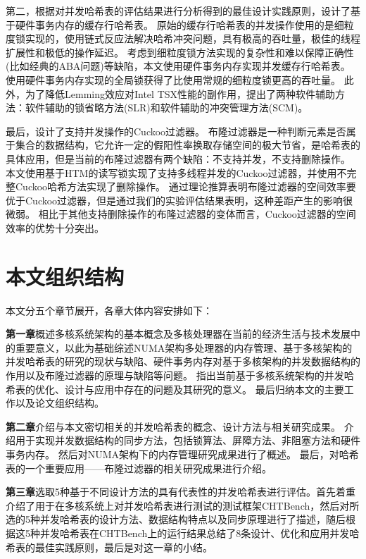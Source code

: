 第二，根据对并发哈希表的评估结果进行分析得到的最佳设计实践原则，设计了基于硬件事务内存的缓存行哈希表。
原始的缓存行哈希表的并发操作使用的是细粒度锁实现的，使用链式反应法解决哈希冲突问题，具有极高的吞吐量，极佳的线程扩展性和极低的操作延迟。
考虑到细粒度锁方法实现的复杂性和难以保障正确性(比如经典的ABA问题)等缺陷，本文使用硬件事务内存实现并发缓存行哈希表。
使用硬件事务内存实现的全局锁获得了比使用常规的细粒度锁更高的吞吐量。
此外，为了降低Lemming效应对Intel TSX性能的副作用，提出了两种软件辅助方法：软件辅助的锁省略方法(SLR)和软件辅助的冲突管理方法(SCM)。

最后，设计了支持并发操作的Cuckoo过滤器。
布隆过滤器是一种判断元素是否属于集合的数据结构，它允许一定的假阳性率换取存储空间的极大节省，是哈希表的具体应用，但是当前的布隆过滤器有两个缺陷：不支持并发，不支持删除操作。
本文使用基于HTM的读写锁实现了支持多线程并发的Cuckoo过滤器，并使用不完整Cuckoo哈希方法实现了删除操作。
通过理论推算表明布隆过滤器的空间效率要优于Cuckoo过滤器，但是通过我们的实验评估结果表明，这种差距产生的影响很微弱。
相比于其他支持删除操作的布隆过滤器的变体而言，Cuckoo过滤器的空间效率的优势十分突出。


\section{本文组织结构}
本文分五个章节展开，各章大体内容安排如下：

\textbf{第一章}概述多核系统架构的基本概念及多核处理器在当前的经济生活与技术发展中的重要意义，以此为基础综述NUMA架构多处理器的内存管理、基于多核架构的并发哈希表的研究的现状与缺陷、硬件事务内存对基于多核架构的并发数据结构的作用以及布隆过滤器的原理与缺陷等问题。
指出当前基于多核系统架构的并发哈希表的优化、设计与应用中存在的问题及其研究的意义。
最后归纳本文的主要工作以及论文组织结构。

\textbf{第二章}介绍与本文密切相关的并发哈希表的概念、设计方法与相关研究成果。
介绍用于实现并发数据结构的同步方法，包括锁算法、屏障方法、非阻塞方法和硬件事务内存。
然后对NUMA架构下的内存管理研究成果进行了概述。
最后，对哈希表的一个重要应用——布隆过滤器的相关研究成果进行介绍。

\textbf{第三章}选取5种基于不同设计方法的具有代表性的并发哈希表进行评估。首先着重介绍了用于在多核系统上对并发哈希表进行测试的测试框架CHTBench，然后对所选的5种并发哈希表的设计方法、数据结构特点以及同步原理进行了描述，随后根据这5种并发哈希表在CHTBench上的运行结果总结了8条设计、优化和应用并发哈希表的最佳实践原则，最后是对这一章的小结。

